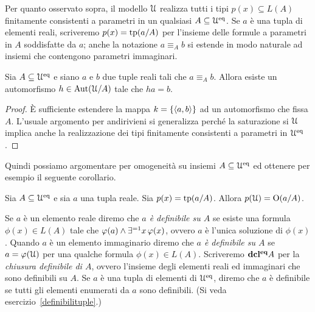 Per quanto osservato sopra, il modello $\EuScript U$ realizza tutti i tipi $p(x)\subseteq L(A)$ finitamente consistenti a parametri in un qualsiasi $A\subseteq\EuScript U^{\rm eq}$. Se $a$ \`e una tupla di elementi reali, scriveremo \emph{$p(x)=\textrm{tp}(a/A)$} per l'insieme delle formule a parametri in $A$ soddisfatte da $a$; anche la notazione \emph{$a\equiv_Ab$\/} si estende in modo naturale ad insiemi che contengono parametri immaginari. 

\begin{lemma}
Sia $A\subseteq\EuScript U^{\rm eq}$ e siano $a$ e $b$ due tuple reali tali che $a\equiv_Ab$. Allora esiste un automorfismo $h\in\textrm{Aut}(\EuScript U/A)$ tale che $ha=b$.
\end{lemma} 

\begin{proof}
\`E sufficiente estendere la mappa $k=\{\langle a,b\rangle\}$ ad un automorfismo che fissa $A$. L'usuale argomento per andirivieni si generalizza perch\'e la saturazione si $\EuScript U$ implica anche la realizzazione dei tipi finitamente consistenti a parametri in $\EuScript U^{\rm eq}$.
\end{proof}

Quindi possiamo argomentare per omogeneit\`a su insiemi $A\subseteq\EuScript U^{\rm eq}$ ed ottenere per esempio il seguente corollario.
\begin{corollary}
Sia $A\subseteq\EuScript U^{\rm eq}$ e sia $a$ una tupla reale. Sia  $p(x)=\textrm{tp}(a/A)$. Allora $p(\EuScript U)=\textrm{O}(a/A)$.\QED
\end{corollary}

Se $a$ \`e un elemento reale diremo che \emph{$a$ \`e definibile su $A$\/} se esiste una formula $\phi(x)\in L(A)$ tale che $\varphi(a)\wedge\exists^{=1}x\,\varphi(x)$, ovvero $a$ \`e l'unica soluzione di $\phi(x)$. Quando $a$ \`e un elemento immaginario diremo che  \emph{$a$ \`e definibile su $A$\/} se $a=\varphi(\EuScript U)$ per una qualche formula $\phi(x)\in L(A)$. Scriveremo \emph{${\rm\bf dcl^{eq}} A$\/} per la \emph{chiusura definibile di $A$}, ovvero l'insieme degli elementi reali ed immaginari che sono definibili su $A$. Se $a$ \`e una tupla di elementi di $\EuScript U^{\rm eq}$, diremo che $a$ \`e definibile se tutti gli elementi enumerati da $a$ sono definibili. (Si veda esercizio~\ref{definibilituple}.)

